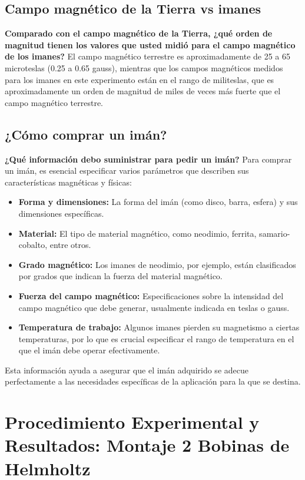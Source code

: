 \subsection{Campo magnético de la Tierra vs imanes}
\textbf{Comparado con el campo magnético de la Tierra, ¿qué orden de magnitud tienen los valores que usted midió para el campo magnético de los imanes?}
El campo magnético terrestre es aproximadamente de 25 a 65 microteslas (0.25 a 0.65 gauss), mientras que los campos magnéticos medidos para los imanes en este experimento están en el rango de militeslas, que es aproximadamente un orden de magnitud de miles de veces más fuerte que el campo magnético terrestre.

\subsection{¿Cómo comprar un imán?}
\textbf{¿Qué información debo suministrar para pedir un imán?}
Para comprar un imán, es esencial especificar varios parámetros que describen sus características magnéticas y físicas:
\begin{itemize}
    \item \textbf{Forma y dimensiones:} La forma del imán (como disco, barra, esfera) y sus dimensiones específicas.
    \item \textbf{Material:} El tipo de material magnético, como neodimio, ferrita, samario-cobalto, entre otros.
    \item \textbf{Grado magnético:} Los imanes de neodimio, por ejemplo, están clasificados por grados que indican la fuerza del material magnético.
    \item \textbf{Fuerza del campo magnético:} Especificaciones sobre la intensidad del campo magnético que debe generar, usualmente indicada en teslas o gauss.
    \item \textbf{Temperatura de trabajo:} Algunos imanes pierden su magnetismo a ciertas temperaturas, por lo que es crucial especificar el rango de temperatura en el que el imán debe operar efectivamente.
\end{itemize}
Esta información ayuda a asegurar que el imán adquirido se adecue perfectamente a las necesidades específicas de la aplicación para la que se destina.


\section{Procedimiento Experimental y Resultados: Montaje 2 Bobinas de Helmholtz}

